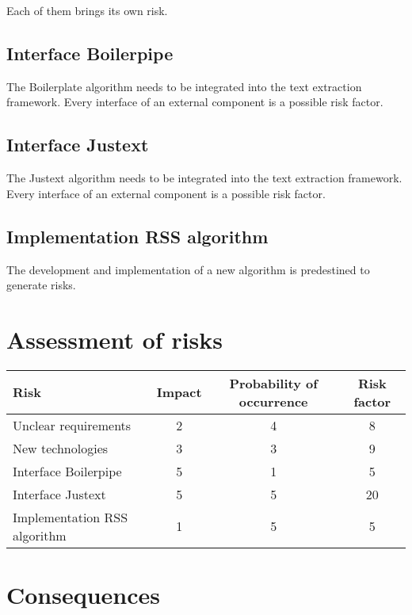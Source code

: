 Each of them brings its own risk.

\subsection{Interface Boilerpipe}

The Boilerplate algorithm needs to be integrated into the text extraction framework. Every interface of an external component is a possible risk factor.

\subsection{Interface Justext}


The Justext algorithm needs to be integrated into the text extraction framework. Every interface of an external component is a possible risk factor.


\subsection{Implementation RSS algorithm}

The development and implementation of a new algorithm is predestined to generate risks.

\section{Assessment of risks}

\begin{table}[h]
\begin{tabular}{|l|c|c|c|}
\hline
\textbf{Risk} & \textbf{Impact} & \textbf{Probability of occurrence} & \textbf{Risk factor} \\ \hline
Unclear requirements & 2 & 4 & 8\\ \hline
New technologies & 3 & 3 & 9 \\ \hline
Interface Boilerpipe & 5 & 1 & 5\\ \hline
Interface Justext & 5 & 5 & 20 \\ \hline
Implementation RSS algorithm & 1 & 5 & 5\\ \hline
\end{tabular}
\end{table}

\section{Consequences}



